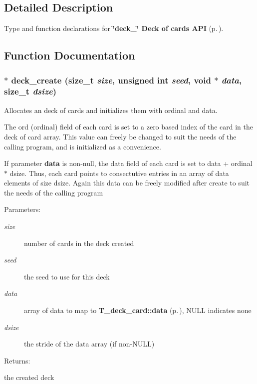 \subsection{Detailed Description}
Type and function declarations for {\bf \char`\"{}deck\_\-\char`\"{} Deck of cards API} {\rm (p.\,\pageref{group__deck})}.





\subsection{Function Documentation}
\subsubsection{$\ast$ deck\_\-create (size\_\-t {\em size}, unsigned int {\em seed}, void $\ast$ {\em data}, size\_\-t {\em dsize})}\label{deck_8h_a0}


Allocates an deck of cards and initializes them with ordinal and data.

The ord (ordinal) field of each card is set to a zero based index of the  card in the deck of card array. This value can freely be changed to suit the needs of the calling program, and is initialized as a convenience.

If parameter {\bf data} is non-null, the data field of each card is set to data + ordinal $\ast$ dsize. Thus, each card points to consectutive entries in an array of data elements of size dsize. Again this data can be freely modified after create to suit the needs of the calling program\begin{Desc}
\item[Parameters: ]\par
\begin{description}
\item[{\em 
size}]number of cards in the deck created \item[{\em 
seed}]the seed to use for this deck \item[{\em 
data}]array of data to map to {\bf T\_\-deck\_\-card::data} {\rm (p.\,\pageref{structT__deck__card_m1})}, NULL indicates none \item[{\em 
dsize}]the stride of the data array (if non-NULL) \end{description}
\end{Desc}
\begin{Desc}
\item[Returns: ]\par
the created deck \end{Desc}
